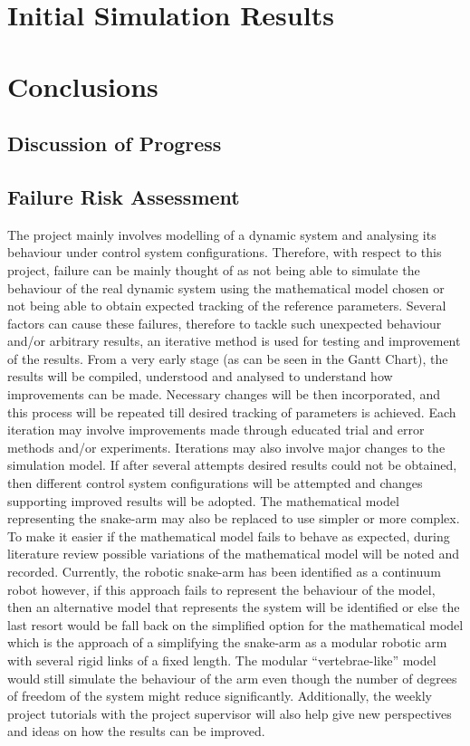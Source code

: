\documentclass[a4paper,12pt]{report}
\begin{document}
\chapter{Initial Simulation Results}


\chapter{Conclusions}
\section{Discussion of Progress}
\section{Failure Risk Assessment}
The project mainly involves modelling of a dynamic system and analysing its behaviour under control system configurations. Therefore, with respect to this project, failure can be mainly thought of as not being able to simulate the behaviour of the real dynamic system using the mathematical model chosen or not being able to obtain expected tracking of the reference parameters.
Several factors can cause these failures, therefore to tackle such unexpected behaviour and/or arbitrary results, an iterative method is used for testing and improvement of the results. From a very early stage (as can be seen in the Gantt Chart), the results will be compiled, understood and analysed to understand how improvements can be made. Necessary changes will be then incorporated, and this process will be repeated till desired tracking of parameters is achieved. Each iteration may involve improvements made through educated trial and error methods and/or experiments. 
Iterations may also involve major changes to the simulation model. If after several attempts desired results could not be obtained, then different control system configurations will be attempted and changes supporting improved results will be adopted. The mathematical model representing the snake-arm may also be replaced to use simpler or more complex. To make it easier if the mathematical model fails to behave as expected, during literature review possible variations of the mathematical model will be noted and recorded.
Currently, the robotic snake-arm has been identified as a continuum robot however, if this approach fails to represent the behaviour of the model, then an alternative model that represents the system will be identified or else the last resort would be fall back on the simplified option for the mathematical model which is the approach of a simplifying the snake-arm as a modular robotic arm with several rigid links of a fixed length. The modular “vertebrae-like” model would still simulate the behaviour of the arm even though the number of degrees of freedom of the system might reduce significantly.
Additionally, the weekly project tutorials with the project supervisor will also help give new perspectives and ideas on how the results can be improved.
\end{document}
